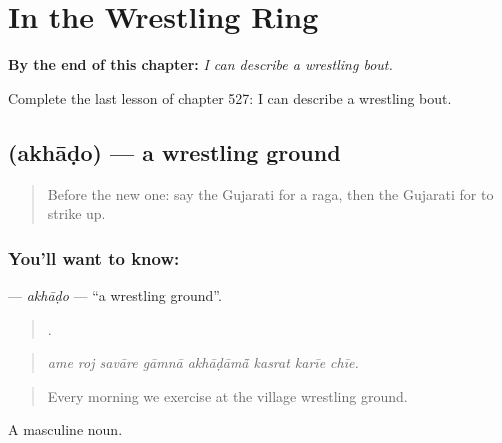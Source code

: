 
\chapter{In the Wrestling Ring}
\label{ch:gu-in-the-wrestling-ring}

\begin{chapteropening}
\textbf{By the end of this chapter:} \emph{I can describe a wrestling bout.}

Complete the last lesson of chapter 527: I can describe a wrestling bout.
\end{chapteropening}

\section[\texorpdfstring{\gu{અખાડો} (akhāḍo)}{અખાડો (akhāḍo)}]{ (akhāḍo) — a wrestling ground}

\label{lesson:GU-C527-akhado}



\begin{quote}
Before the new one: say the Gujarati for a raga, then the Gujarati for to strike up.
\end{quote}

\subsection*{You'll want to know: }
\textbf{} — \emph{akhāḍo} — \textquotedblleft{}a wrestling ground\textquotedblright{}.

\begin{quote}
       .
\end{quote}

\begin{quote}
\emph{ame roj savāre gāmnā akhāḍāmā̃ kasrat karīe chīe.}
\end{quote}

\begin{quote}
Every morning we exercise at the village wrestling ground.
\end{quote}

A masculine noun.

